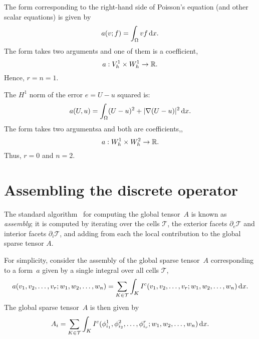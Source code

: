 \begin{example}
\label{example:rhs}
The form corresponding to the right-hand side of Poisson's equation
(and other scalar equations) is given by
\begin{equation}
a(v; f) = \int_{\Omega} v f \, \mathrm{d}x.
\end{equation}
The form takes two arguments and one of them is a coefficient,
\begin{equation}
a : V_h^1 \times  W_h^1 \rightarrow \mathbb{R}.
\end{equation}
Hence, $r = n = 1$.
\end{example}

\begin{example}
The $H^1$ norm of the error $e = U - u$ squared is: 
\begin{equation}
a(U, u) = \int_{\Omega} (U - u)^2 + |\nabla (U - u)|^2 \, \mathrm{d}x.
\end{equation}
The form takes two argumentsa and both are coefficients,,
\begin{equation}
a : W_h^1 \times  W_h^2 \rightarrow \mathbb{R}.
\end{equation}
Thus, $r=0$ and $n=2$. 
\end{example}

\section{Assembling the discrete operator}

The standard algorithm~\cite{ZieTay67,Hug87,Lan99} for computing
the global tensor~$A$ is known as \emph{assembly}; it is
computed by iterating over the cells $\mathcal{T}$, 
the exterior facets $\partial_e\mathcal{T}$ and
interior facets $\partial_i\mathcal{T}$, and adding from each
the local contribution to the global sparse tensor $A$.

For simplicity, consider the assembly of the global sparse tensor~$A$
corresponding to a form~$a$ given by a single integral
over all cells $\mathcal{T}$,
\begin{equation}
  a(v_1, v_2, \ldots, v_r; w_1, w_2, \ldots, w_n) =
  \sum_{K\in\mathcal{T}} \int_K
  I^c(v_1, v_2, \ldots, v_r; w_1, w_2, \ldots, w_n) \, \mathrm{d}x.
\end{equation}
The global sparse tensor~$A$ is then given by
\begin{equation}
  A_i = \sum_{K\in\mathcal{T}} \int_K
  I^c(\phi^1_{i_1}, \phi^2_{i_2}, \ldots, \phi^r_{i_r}; w_1, w_2, \ldots, w_n) \, \mathrm{d}x.
\end{equation}

